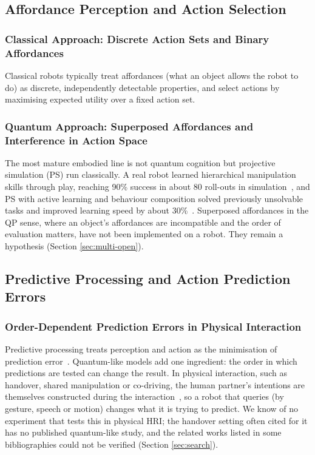\documentclass[pdflatex,sn-basic]{sn-jnl}
\begin{document}
\subsection{Affordance Perception and Action Selection}\label{sec:affordance}

\subsubsection{Classical Approach: Discrete Action Sets and Binary Affordances}
Classical robots typically treat affordances (what an object allows the robot to do) as discrete, independently detectable properties, and select actions by maximising expected utility over a fixed action set.

\subsubsection{Quantum Approach: Superposed Affordances and Interference in Action Space}
The most mature embodied line is not quantum cognition but projective simulation (PS) run classically. A real robot learned hierarchical manipulation skills through play, reaching 90\% success in about 80 roll-outs in simulation~\citep{Hangl2016}, and PS with active learning and behaviour composition solved previously unsolvable tasks and improved learning speed by about 30\%~\citep{Hangl2020}. Superposed affordances in the QP sense, where an object's affordances are incompatible and the order of evaluation matters, have not been implemented on a robot. They remain a hypothesis (Section \ref{sec:multi-open}).

\subsection{Predictive Processing and Action Prediction Errors}\label{sec:predictive}

\subsubsection{Order-Dependent Prediction Errors in Physical Interaction}
Predictive processing treats perception and action as the minimisation of prediction error~\citep{Friston2010,Clark2013}. Quantum-like models add one ingredient: the order in which predictions are tested can change the result. In physical interaction, such as handover, shared manipulation or co-driving, the human partner's intentions are themselves constructed during the interaction~\citep{Kvam2021}, so a robot that queries (by gesture, speech or motion) changes what it is trying to predict. We know of no experiment that tests this in physical HRI; the handover setting often cited for it has no published quantum-like study, and the related works listed in some bibliographies could not be verified (Section \ref{sec:search}).
\end{document}
